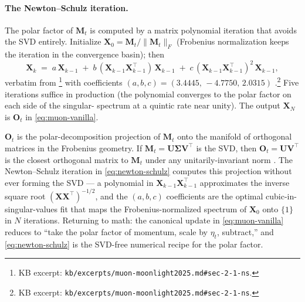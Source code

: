 \paragraph{The Newton--Schulz iteration.}
The polar factor of $\mathbf{M}_t$ is computed by a matrix polynomial
iteration that avoids the SVD entirely. Initialize
$\mathbf{X}_0 = \mathbf{M}_t / \|\mathbf{M}_t\|_F$ (Frobenius
normalization keeps the iteration in the convergence basin); then
\begin{equation}
\mathbf{X}_k \;=\; a\,\mathbf{X}_{k-1}
   \;+\; b\,(\mathbf{X}_{k-1} \mathbf{X}_{k-1}^\top)\,\mathbf{X}_{k-1}
   \;+\; c\,(\mathbf{X}_{k-1} \mathbf{X}_{k-1}^\top)^2\,\mathbf{X}_{k-1},
\label{eq:newton-schulz}
\tag{4}
\end{equation}
verbatim from \citet[\S 2.1, eq.\ 2]{muon-moonlight2025}\footnote{KB
excerpt: \nolinkurl{kb/excerpts/muon-moonlight2025.md#sec-2-1-ns}.}
with coefficients
$(a, b, c) = (3.4445,\, -4.7750,\, 2.0315)$
\citep[K.\ Jordan et al.\ 2024, cited in \S
2.1]{muon-moonlight2025}.\footnote{KB excerpt:
\nolinkurl{kb/excerpts/muon-moonlight2025.md#sec-2-1-ns}.} Five
iterations suffice in production (the polynomial converges to the
polar factor on each side of the singular- spectrum at a quintic
rate near unity). The output $\mathbf{X}_N$ is $\mathbf{O}_t$ in
\cref{eq:muon-vanilla}.

\begin{analogy}
\label{analogy:polar}
$\mathbf{O}_t$ is the polar-decomposition projection of
$\mathbf{M}_t$ onto the manifold of orthogonal matrices in the
Frobenius geometry. If $\mathbf{M}_t = \mathbf{U} \boldsymbol{\Sigma}
\mathbf{V}^\top$ is the SVD, then $\mathbf{O}_t = \mathbf{U}
\mathbf{V}^\top$ is the closest orthogonal matrix to $\mathbf{M}_t$
under any unitarily-invariant norm
\citep[Mirsky 1960]{muon-moonlight2025}.
The Newton--Schulz iteration in \cref{eq:newton-schulz} computes this
projection without ever forming the SVD --- a polynomial in
$\mathbf{X}_{k-1} \mathbf{X}_{k-1}^\top$ approximates the inverse
square root $(\mathbf{X} \mathbf{X}^\top)^{-1/2}$, and the
$(a, b, c)$ coefficients are the optimal cubic-in-singular-values fit
that maps the Frobenius-normalized spectrum of $\mathbf{X}_0$ onto
$\{1\}$ in $N$ iterations. Returning to math: the canonical 
update in \cref{eq:muon-vanilla} reduces to ``take the polar factor
of momentum, scale by $\eta_t$, subtract,'' and \cref{eq:newton-schulz}
is the SVD-free numerical recipe for the polar factor.
\end{analogy}

